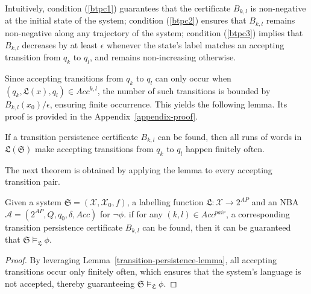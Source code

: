 Intuitively, condition (\ref{btpc1}) guarantees that the certificate $B_{k,l}$ is non-negative at the initial state of the system; condition (\ref{btpc2}) ensures that $B_{k,l}$ remains non-negative along any trajectory of the system; condition (\ref{btpc3}) implies that $B_{k,l}$ decreases by at least $\epsilon$ whenever the state's label matches an accepting transition from $q_k$ to $q_l$, and remains non-increasing otherwise.


Since accepting transitions from $q_k$ to $q_l$ can only occur when $(q_k, \mathfrak{L}(x), q_l) \in Acc^{k,l}$, the number of such transitions is bounded by $B_{k,l}(x_0)/\epsilon$, ensuring finite occurrence. This yields the following lemma. Its proof is provided in the Appendix~\ref{appendix-proof}.

\begin{lemma}
  \label{transition-persistence-lemma}
  If a transition persistence certificate $B_{k,l}$ can be found, then all runs of words in $\mathfrak{L}(\mathfrak{S})$ make accepting transitions from $q_k$ to $q_l$ happen finitely often.
\end{lemma}

The next theorem is obtained by applying the lemma to every accepting transition pair.

\begin{theorem}
  \label{transition-persistence-LTL}
  Given a system $\mathfrak{S} = (\mathcal{X}, \mathcal{X}_0, f)$, a labelling function $\mathfrak{L}:\mathcal{X} \rightarrow 2^{AP}$ and an NBA $\mathcal{A} = (2^{AP}, Q, q_0, \delta, Acc)$ for $\neg\phi$. if for any $(k, l) \in Acc^{pair}$, a corresponding transition persistence certificate $B_{k,l}$ can be found, then it can be guaranteed that $\mathfrak{S} \models_{\mathfrak{L}} \phi$.
\end{theorem}

\begin{proof}
By leveraging Lemma~\ref{transition-persistence-lemma}, all accepting transitions occur only finitely often, which ensures that the system's language is not accepted, thereby guaranteeing $\mathfrak{S} \models_{\mathfrak{L}} \phi$.
\end{proof}

